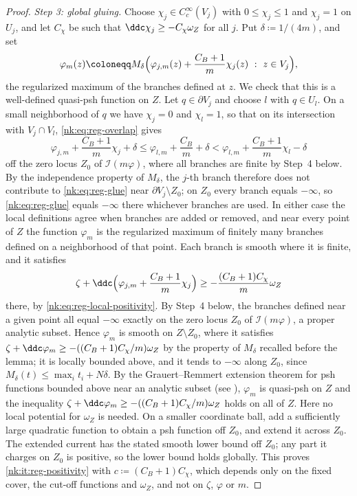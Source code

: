 \begin{proof}
\emph{Step 3: global gluing.}
Choose $\chi_j\in C^\infty_c(V_j)$ with $0\le\chi_j\le1$ and
$\chi_j=1$ on $U_j$, and let $C_\chi$ be such that
$\ddc\chi_j\ge-C_\chi\omega_Z$ for all $j$. Put
$\delta\coloneqq 1/(4m)$, and set
\begin{equation}\label{nk:eq:reg-glue}
  \varphi_m(z)\coloneqq M_\delta\Bigl(\varphi_{j,m}(z)+\frac{C_B+1}m\chi_j(z)
   \ :\ z\in V_j\Bigr),
\end{equation}
the regularized maximum of the branches defined at $z$. We check that
this is a well-defined quasi-psh function on $Z$. Let
$q\in\partial V_j$ and choose $l$ with $q\in U_l$. On a small
neighborhood of $q$ we have $\chi_j=0$ and $\chi_l=1$, so that on
its intersection with $V_j\cap V_l$, \eqref{nk:eq:reg-overlap} gives
\[
  \varphi_{j,m}+\frac{C_B+1}m\chi_j+\delta
  \le\varphi_{l,m}+\frac{C_B}{m}+\delta
  <\varphi_{l,m}+\frac{C_B+1}m\chi_l-\delta
\]
off the zero locus $Z_0$ of $\mathcal I(m\varphi)$, where all branches
are finite by Step~4 below. By the independence property of
$M_\delta$, the $j$-th branch therefore does
not contribute to \eqref{nk:eq:reg-glue} near $\partial V_j\setminus Z_0$;
on $Z_0$ every branch equals $-\infty$, so \eqref{nk:eq:reg-glue}
equals $-\infty$ there whichever branches are used. In either case the local
definitions agree when branches are added or removed, and near every point
of $Z$ the function $\varphi_m$ is the regularized maximum of finitely
many branches defined on a neighborhood of that point. Each branch is
smooth where it is finite, and it satisfies
\[
  \zeta+\ddc\Bigl(\varphi_{j,m}+\frac{C_B+1}m\chi_j\Bigr)
  \ge-\frac{(C_B+1)C_\chi}{m}\omega_Z
\]
there, by \eqref{nk:eq:reg-local-positivity}. By Step~4 below, the branches
defined near a given point all equal $-\infty$ exactly on the zero
locus $Z_0$ of $\mathcal I(m\varphi)$, a proper analytic subset. Hence
$\varphi_m$ is smooth on $Z\setminus Z_0$, where it satisfies
$\zeta+\ddc\varphi_m\ge-((C_B+1)C_\chi/m)\omega_Z$ by the property of
$M_\delta$ recalled before the lemma; it is locally bounded above, and
it tends to $-\infty$ along $Z_0$, since
$M_\delta(t)\le\max_it_i+N\delta$. By the Grauert--Remmert extension
theorem for psh functions bounded above near an analytic subset
\cite{GR56} (see \cite[Theorem~1.2.1]{SGPT}), $\varphi_m$ is
quasi-psh on $Z$ and
the inequality $\zeta+\ddc\varphi_m\ge-((C_B+1)C_\chi/m)\omega_Z$ holds on
all of $Z$. Here no local potential for $\omega_Z$ is needed. On a smaller coordinate ball, add a sufficiently large quadratic function to obtain a psh function off $Z_0$, and extend it across $Z_0$. The extended current has the stated smooth lower bound off $Z_0$; any part it charges on $Z_0$ is positive, so the lower bound holds globally. This proves \ref{nk:it:reg-positivity} with
$c\coloneqq (C_B+1)C_\chi$,
which depends only on the fixed cover, the cut-off functions and
$\omega_Z$, and not on $\zeta$, $\varphi$ or $m$.
 

\end{proof}
